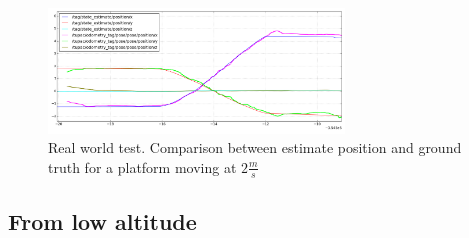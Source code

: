 \begin{figure}[!ht]
    \centering
    \includegraphics[width=0.7\textwidth]{img/position_real_world_fast.png}
      \caption{Real world test. Comparison between estimate position and ground truth for a platform moving at $2\frac{m}{s}$}
    \label{fig:ekf_position_real_fast}
\end{figure}


\newpage

\subsection{From low altitude}

